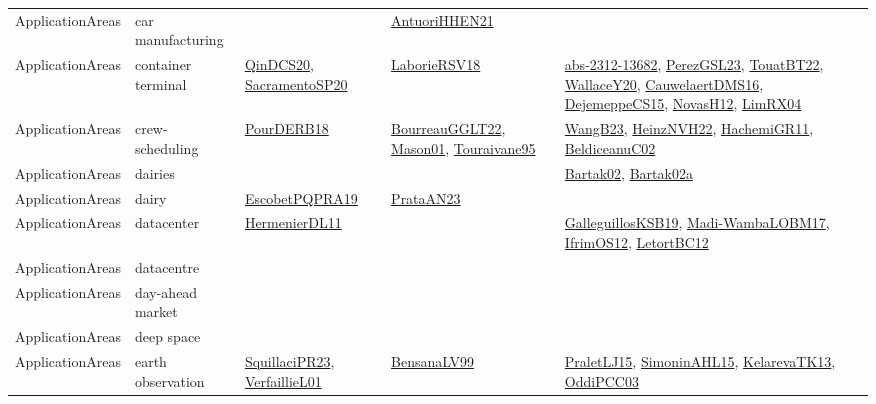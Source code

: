 {\begin{longtable}{lp{3cm}>{\raggedright}p{6cm}>{\raggedright}p{6cm}p{8cm}}
ApplicationAreas & car manufacturing &  & \href{papers/AntuoriHHEN21.pdf}{AntuoriHHEN21}\cite{AntuoriHHEN21} & \\
ApplicationAreas & container terminal & \href{articles/QinDCS20.pdf}{QinDCS20}\cite{QinDCS20}, \href{articles/SacramentoSP20.pdf}{SacramentoSP20}\cite{SacramentoSP20} & \href{articles/LaborieRSV18.pdf}{LaborieRSV18}\cite{LaborieRSV18} & \href{articles/abs-2312-13682.pdf}{abs-2312-13682}\cite{abs-2312-13682}, \href{papers/PerezGSL23.pdf}{PerezGSL23}\cite{PerezGSL23}, \href{papers/TouatBT22.pdf}{TouatBT22}\cite{TouatBT22}, \href{articles/WallaceY20.pdf}{WallaceY20}\cite{WallaceY20}, \href{papers/CauwelaertDMS16.pdf}{CauwelaertDMS16}\cite{CauwelaertDMS16}, \href{papers/DejemeppeCS15.pdf}{DejemeppeCS15}\cite{DejemeppeCS15}, \href{articles/NovasH12.pdf}{NovasH12}\cite{NovasH12}, \href{papers/LimRX04.pdf}{LimRX04}\cite{LimRX04}\\
ApplicationAreas & crew-scheduling & \href{articles/PourDERB18.pdf}{PourDERB18}\cite{PourDERB18} & \href{articles/BourreauGGLT22.pdf}{BourreauGGLT22}\cite{BourreauGGLT22}, \href{articles/Mason01.pdf}{Mason01}\cite{Mason01}, \href{papers/Touraivane95.pdf}{Touraivane95}\cite{Touraivane95} & \href{papers/WangB23.pdf}{WangB23}\cite{WangB23}, \href{articles/HeinzNVH22.pdf}{HeinzNVH22}\cite{HeinzNVH22}, \href{articles/HachemiGR11.pdf}{HachemiGR11}\cite{HachemiGR11}, \href{papers/BeldiceanuC02.pdf}{BeldiceanuC02}\cite{BeldiceanuC02}\\
ApplicationAreas & dairies &  &  & \href{papers/Bartak02.pdf}{Bartak02}\cite{Bartak02}, \href{papers/Bartak02a.pdf}{Bartak02a}\cite{Bartak02a}\\
ApplicationAreas & dairy & \href{articles/EscobetPQPRA19.pdf}{EscobetPQPRA19}\cite{EscobetPQPRA19} & \href{articles/PrataAN23.pdf}{PrataAN23}\cite{PrataAN23} & \\
ApplicationAreas & datacenter & \href{papers/HermenierDL11.pdf}{HermenierDL11}\cite{HermenierDL11} &  & \href{papers/GalleguillosKSB19.pdf}{GalleguillosKSB19}\cite{GalleguillosKSB19}, \href{papers/Madi-WambaLOBM17.pdf}{Madi-WambaLOBM17}\cite{Madi-WambaLOBM17}, \href{papers/IfrimOS12.pdf}{IfrimOS12}\cite{IfrimOS12}, \href{papers/LetortBC12.pdf}{LetortBC12}\cite{LetortBC12}\\
ApplicationAreas & datacentre &  &  & \\
ApplicationAreas & day-ahead market &  &  & \\
ApplicationAreas & deep space &  &  & \\
ApplicationAreas & earth observation & \href{papers/SquillaciPR23.pdf}{SquillaciPR23}\cite{SquillaciPR23}, \href{papers/VerfaillieL01.pdf}{VerfaillieL01}\cite{VerfaillieL01} & \href{articles/BensanaLV99.pdf}{BensanaLV99}\cite{BensanaLV99} & \href{papers/PraletLJ15.pdf}{PraletLJ15}\cite{PraletLJ15}, \href{articles/SimoninAHL15.pdf}{SimoninAHL15}\cite{SimoninAHL15}, \href{papers/KelarevaTK13.pdf}{KelarevaTK13}\cite{KelarevaTK13}, \href{papers/OddiPCC03.pdf}{OddiPCC03}\cite{OddiPCC03}\\

\end{longtable}}
